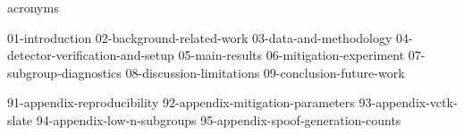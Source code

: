 \documentclass[a4paper,oneside,10pt,ngerman,english]{scrbook}
\begin{document}
\cleardoubleoddpage
\tableofcontents

\cleardoubleoddpage
\listoftables

\cleardoubleoddpage
\listoffigures

\cleardoubleoddpage
{acronyms}



\mainmatter

{01-introduction}
{02-background-related-work}
{03-data-and-methodology}
{04-detector-verification-and-setup}
{05-main-results}
{06-mitigation-experiment}
{07-subgroup-diagnostics}
{08-discussion-limitations}
{09-conclusion-future-work}



\cleardoubleoddpage
\printbibliography



\appendix

{91-appendix-reproducibility}
{92-appendix-mitigation-parameters}
{93-appendix-vctk-slate}
{94-appendix-low-n-subgroups}
{95-appendix-spoof-generation-counts}


\cleardoubleoddpage
\end{document}
